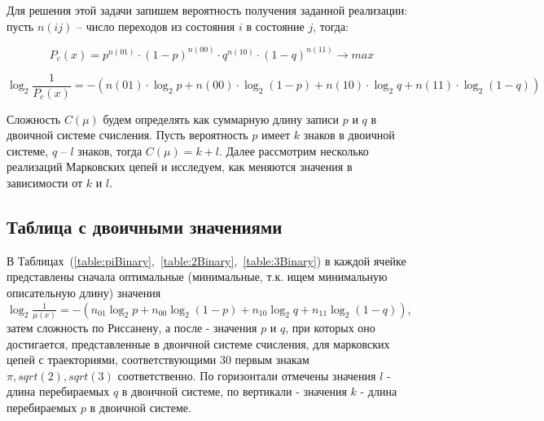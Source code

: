 \documentclass[12pt]{article}
\begin{document}
	Для решения этой задачи запишем вероятность получения заданной реализации: пусть $n(ij)$ -- число переходов из состояния $i$ в состояние $j$, тогда:
	
	\begin{equation}P_c(x) = p^{n(01)}\cdot(1-p)^{n(00)}\cdot q^{n(10)}\cdot(1-q)^{n(11)}\to max\end{equation}
	
	\begin{equation}\label{log}\log_2{\frac{1}{P_c(x)}}=-(n(01)\cdot\log_2{p}+n(00)\cdot\log_2{(1-p)}+n(10)\cdot\log_2{q}+n(11)\cdot\log_2{(1-q)})\end{equation}
	
	Сложность $C(\mu)$ будем определять как суммарную длину записи $p$ и $q$ в двоичной системе счисления. Пусть вероятность $p$ имеет $k$ знаков в двоичной системе, $q$ -- $l$ знаков, тогда $C(\mu)=k+l$. Далее рассмотрим несколько реализаций Марковских цепей и исследуем, как меняются значения в зависимости от $k$ и $l$.
	
	\subsection*{Таблица с двоичными значениями}
	В Таблицах~(\ref{table:piBinary},~\ref{table:2Binary},~\ref{table:3Binary}) в каждой ячейке представлены сначала оптимальные (минимальные, т.к. ищем минимальную описательную длину) значения $\log_2{\frac{1}{\mu(x)}}=-(n_{01}\log_2{p}+n_{00}\log_2{(1-p)}+n_{10}\log_2{q}+n_{11}\log_2{(1-q)})$, затем сложность по Риссанену, а после - значения $p$ и $q$, при которых оно достигается, представленные в двоичной системе счисления, для марковских цепей с траекториями, соответствующими 30 первым знакам $\pi, sqrt(2), sqrt(3)$ соответственно. По горизонтали отмечены значения $l$ - длина перебираемых $q$  в двоичной системе, по вертикали - значения $k$ - длина перебираемых $p$  в двоичной системе.
	
\end{document}
